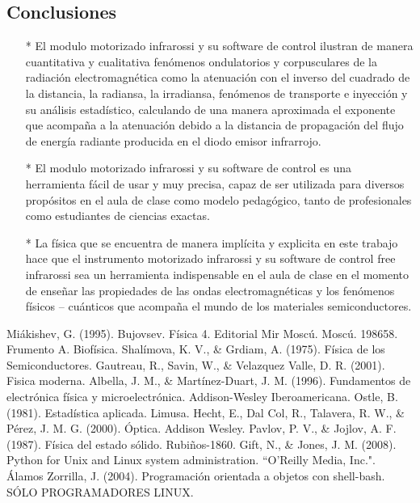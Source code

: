 \documentclass[12]{article}
\begin{document}
\begin{multicols}{2}
\section{Conclusiones}
\begin{enumerate}
\item[*] El modulo motorizado infrarossi y su software de control ilustran de manera cuantitativa y cualitativa fenómenos ondulatorios y corpusculares  de la radiación electromagnética como la atenuación con el inverso del cuadrado de la distancia, la radiansa, la irradiansa, fenómenos de transporte e  inyección y su análisis estadístico, calculando de una manera aproximada el exponente que acompaña a la atenuación debido a la distancia de propagación del flujo de energía radiante producida en el diodo emisor infrarrojo.   
\item[*] El modulo motorizado infrarossi y su software de control es una herramienta fácil de usar y muy precisa, capaz de ser utilizada para diversos propósitos en el aula de clase como modelo pedagógico,  tanto de profesionales como estudiantes de ciencias exactas.
\item[*] La física que se encuentra de manera implícita y explicita en este trabajo hace que el instrumento motorizado infrarossi y su software de control free infrarossi sea un herramienta indispensable  en el aula de clase en el momento de enseñar las  propiedades de las ondas electromagnéticas y los fenómenos físicos – cuánticos  que acompaña el mundo de los materiales  semiconductores.
\end{enumerate}
\begin{thebibliography}{99}
 Miákishev, G. (1995). Bujovsev. Física 4. Editorial Mir Moscú. Moscú. 198658. Frumento A. Biofísica.
 Shalímova, K. V., \& Grdiam, A. (1975). Física de los Semiconductores.
 Gautreau, R., Savin, W., \& Velazquez Valle, D. R. (2001). Fisica moderna.
 Albella, J. M., \& Martínez-Duart, J. M. (1996). Fundamentos de electrónica física y microelectrónica. Addison-Wesley Iberoamericana.
 Ostle, B. (1981). Estadística aplicada. Limusa.
 Hecht, E., Dal Col, R., Talavera, R. W., \& Pérez, J. M. G. (2000). Óptica. Addison Wesley.
 Pavlov, P. V., \& Jojlov, A. F. (1987). Física del estado sólido. Rubiños-1860.
 Gift, N., \& Jones, J. M. (2008). Python for Unix and Linux system administration. ``O'Reilly Media, Inc.".
 Álamos Zorrilla, J. (2004). Programación orientada a objetos con shell-bash. SÓLO PROGRAMADORES LINUX.
\end{thebibliography}
\end{multicols}
\end{document}
